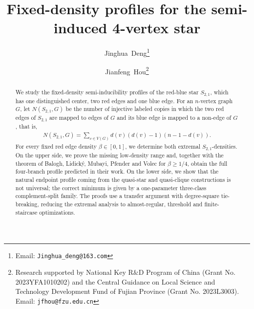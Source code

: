 \documentclass[10pt,a4paper]{article}
\begin{document}
%
\title{\bf\Large Fixed-density profiles for the semi-induced 4-vertex star}
\renewcommand\Authfont{\normalsize}
\renewcommand\Affilfont{\small}
\setlength{\affilsep}{0.35em}
\renewcommand\Authands{, }
%
\author[1]{Jinghua~Deng\thanks{Email: \texttt{Jinghua\_deng@163.com}}}
\author[1]{Jianfeng~Hou\thanks{Research supported by National Key R$\&$D Program of China (Grant No. 2023YFA1010202) and the Central Guidance on Local Science and Technology Development Fund of Fujian Province (Grant No. 2023L3003). Email: \texttt{jfhou@fzu.edu.cn}}}
\maketitle
\begin{abstract}
We study the fixed-density semi-inducibility profiles of the red-blue star
$S_{2,1}$, which has one distinguished center, two red edges and one blue
edge.  For an $n$-vertex graph $G$, let $N(S_{2,1},G)$ be the number of
injective labeled copies in which the two red edges of $S_{2,1}$ are mapped
to edges of $G$ and its blue edge is mapped to a non-edge of $G$, that is, 
\begin{align*}
    N(S_{2,1},G)=
    \sum_{v\in V(G)} d(v)(d(v)-1)(n-1-d(v)).
\end{align*}
For every fixed red edge density $\beta\in[0,1]$, we determine both
extremal $S_{2,1}$-densities.  On the upper side, we prove the missing
low-density range and, together with the theorem of Balogh, Lidick\'y,
Mubayi, Pfender and Volec for $\beta\ge 1/4$, obtain the full
four-branch profile predicted in their work.  On the lower side, we show
that the natural endpoint profile coming from the quasi-star and
quasi-clique constructions is not universal; the correct minimum is
given by a one-parameter three-class complement-split family. The proofs use a transfer argument with degree-square
tie-breaking, reducing the extremal analysis to almost-regular, threshold and
finite-staircase optimizations.

\end{abstract}
\end{document}
